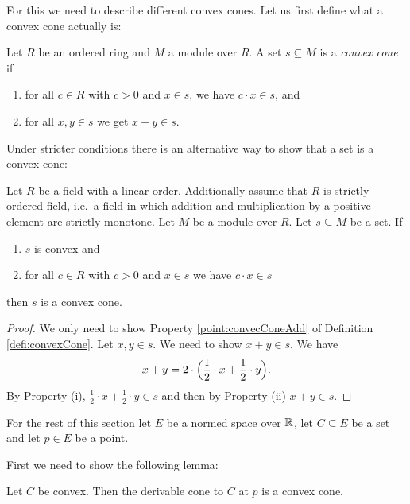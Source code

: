 For this we need to describe different convex cones. 
Let us first define what a convex cone actually is: 
\begin{defi}\label{defi:convexCone}
Let $R$ be an ordered ring and $M$ a module over $R$. 
A set $s \subseteq M$ is a \emph{convex cone} if 
\begin{enumerate}
    \item for all $c \in R$ with $c > 0$ and $x \in s$, we have $c \cdot x \in s$, and \label{point:convexConeSmul}
    \item for all $x, y \in s$ we get $x + y \in s$.  \label{point:convecConeAdd}
\end{enumerate}
\end{defi}

Under stricter conditions there is an alternative way to show that a set is a convex cone:

\begin{lem}
Let $R$ be a field with a linear order. 
Additionally assume that $R$ is strictly ordered field, i.e.\ a field in which addition and multiplication by a positive element are strictly monotone. 
Let $M$ be a module over $R$. 
Let $s \subseteq M$ be a set. 
If 
\begin{enumerate}
    \item $s$ is convex and 
    \item for all $c \in R$ with $c > 0$ and $x \in s$ we have $c \cdot x \in s$ \label{point:convexConeOfConvexSmul}
\end{enumerate}
then $s$ is a convex cone. 
\end{lem}
\begin{proof}
We only need to show Property \ref{point:convecConeAdd} of Definition \ref{defi:convexCone}.
Let $x, y \in s$. We need to show $x + y \in s$. 
We have 
\begin{equation*}
x + y = 2 \cdot \Bigl(\frac{1}{2} \cdot x + \frac{1}{2} \cdot y\Bigr).   
\end{equation*}
By Property (i), $\frac{1}{2} \cdot x + \frac{1}{2} \cdot y \in s$ and then by Property (ii) $x + y \in s$.  
\end{proof}

For the rest of this section let $E$ be a normed space over $\mathbb{R}$, let $C \subseteq E$ be a set and let $p \in E$ be a point. 

First we need to show the following lemma: 

\begin{lem}
Let $C$ be convex.
Then the derivable cone to $C$ at $p$ is a convex cone.
\end{lem}

